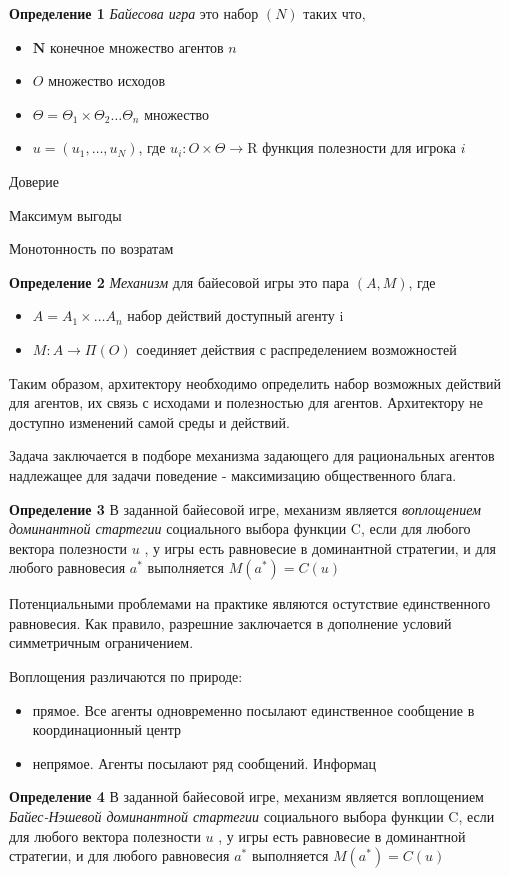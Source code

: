 

\textbf{Определение 1} \textit{Байесова игра} это набор $(N)$ таких что,

\begin{itemize}
    \item $\mathbf{N}$ конечное множество агентов $n$
    \item $O$ множество исходов
    \item $\Theta = \Theta_1 \times \Theta_2 \dots \Theta_n $ множество 
    \item $u = (u_1, \dots, u_N)$, где $u_i: O \times \Theta \rightarrow \mathrm{R}$  функция полезности для игрока $i$
\end{itemize}


Доверие

Максимум выгоды

Монотонность по возратам


\textbf{Определение 2} \textit{Механизм} для байесовой игры это пара $(A,M)$, где
\begin{itemize}
    \item $A = A_1 \times \dots A_n$ набор действий доступный агенту i
    \item $M: A \rightarrow \Pi(O)$ соединяет действия с распределением возможностей
\end{itemize}


Таким образом, архитектору необходимо определить набор возможных действий для агентов,  их связь с исходами и полезностью для агентов. Архитектору не доступно изменений самой среды и действий.


Задача заключается в подборе механизма задающего для рациональных агентов надлежащее для задачи поведение - максимизацию общественного блага.

\textbf{Определение 3} В заданной байесовой игре, механизм является \textit{воплощением доминантной стартегии} социального выбора функции C, если для любого вектора полезности $u$ , у игры есть равновесие в доминантной стратегии, и для любого равновесия $a^*$ выполняется $M(a^*) = C(u)$

Потенциальными проблемами на практике являются остутствие единственного равновесия. Как правило, разрешние заключается в дополнение условий симметричным ограничением.\cite{milgrom1982theory}

Воплощения различаются по природе:
\begin{itemize}
\item прямое. Все агенты одновременно посылают единственное сообщение в координационный центр
\item непрямое. Агенты посылают ряд сообщений. Информац
\end{itemize}



\textbf{Определение 4} В заданной байесовой игре, механизм является воплощением \textit{Байес-Нэшевой доминантной стартегии} социального выбора функции C, если для любого вектора полезности $u$ , у игры есть равновесие в доминантной стратегии, и для любого равновесия $a^*$ выполняется $M(a^*) = C(u)$

